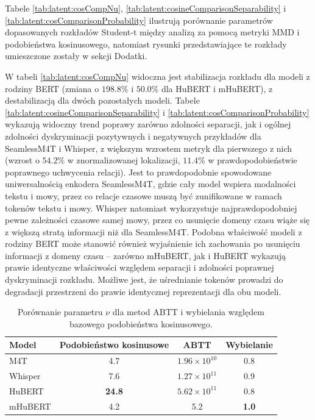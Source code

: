 Tabele \ref{tab:latent:cosCompNu}, \ref{tab:latent:cosineComparisonSeparability} i \ref{tab:latent:cosComparisonProbability} ilustrują porównanie parametrów dopasowanych rozkładów Student-t między analizą za pomocą metryki MMD i podobieństwa kosinusowego, natomiast rysunki przedstawiające te rozkłady umieszczone zostały w sekcji Dodatki.

W tabeli \ref{tab:latent:cosCompNu} widoczna jest stabilizacja rozkładu dla modeli z rodziny BERT (zmiana o $198.8\%$ i $50.0\%$ dla HuBERT i mHuBERT), z destabilizacją dla dwóch pozostałych modeli. Tabele \ref{tab:latent:cosineComparisonSeparability} i \ref{tab:latent:cosComparisonProbability} wykazują widoczny trend poprawy zarówno zdolności separacji, jak i ogólnej zdolności dyskryminacji pozytywnych i negatywnych przykładów dla SeamlessM4T i Whisper, z większym wzrostem metryk dla pierwszego z nich (wzrost o $54.2\%$ w znormalizowanej lokalizacji, $11.4\%$ w prawdopodobieństwie poprawnego uchwycenia relacji). Jest to prawdopodobnie spowodowane uniwersalnością enkodera SeamlessM4T, gdzie cały model wspiera modalności tekstu i mowy, przez co relacje czasowe muszą być zunifikowane w ramach tokenów tekstu i mowy. Whisper natomiast wykorzystuje najprawdopodobniej pewne zależności czasowe samej mowy, przez co usunięcie domeny czasu wiąże się z większą stratą informacji niż dla SeamlessM4T. Podobna właściwość modeli z rodziny BERT może stanowić również wyjaśnienie ich zachowania po usunięciu informacji z domeny czasu -- zarówno mHuBERT, jak i HuBERT wykazują prawie identyczne właściwości względem separacji i zdolności poprawnej dyskryminacji rozkładu. Możliwe jest, że uśrednianie tokenów prowadzi do degradacji przestrzeni do prawie identycznej reprezentacji dla obu modeli.

\begin{table}[!ht]
\centering
\begin{tabular}{lccc}
\toprule
Model &
Podobieństwo kosinusowe &
ABTT &
Wybielanie \\
\midrule
M4T     & 4.7  & $1.96\times10^{10}$ & 0.8 \\
Whisper & 7.6  & $1.27\times10^{11}$ & 0.9 \\
HuBERT  & \textbf{24.8} & \textbf{$5.62\times10^{11}$} & 0.8 \\
mHuBERT & 4.2  & 5.2                 & \textbf{1.0} \\
\bottomrule
\end{tabular}
\caption{Porównanie parametru $\nu$ dla metod ABTT i wybielania względem bazowego podobieństwa kosinusowego.}
\label{tab:latent:compNu}
\end{table}

